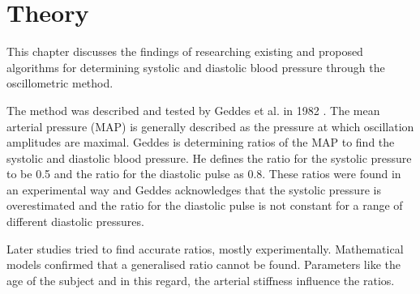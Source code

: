 \chapter{Theory}\label{cp:theory} %
This chapter discusses the findings of researching existing and proposed algorithms for determining systolic and diastolic blood pressure through the oscillometric method.

The method was described and tested by Geddes et al. in 1982 \cite{Geddes1982}. The mean arterial pressure (MAP) is generally described as the pressure at which oscillation amplitudes are maximal. Geddes is determining ratios of the MAP to find the systolic and diastolic blood pressure. He defines the ratio for the systolic pressure to be 0.5 and the ratio for the diastolic pulse as 0.8. These ratios were found in an experimental way and Geddes acknowledges that the systolic pressure is overestimated and the ratio for the diastolic pulse is not constant for a range of different diastolic pressures.

Later studies tried to find accurate ratios, mostly experimentally. Mathematical models confirmed that a generalised ratio cannot be found. Parameters like the age of the subject and in this regard, the arterial stiffness influence the ratios. \cite{Babbs2012}

